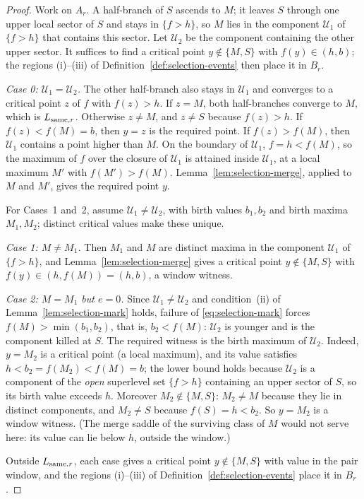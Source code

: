 \begin{proof}
Work on $A_r$. A half-branch of $S$ ascends to $M$; it leaves $S$ through one upper local sector of $S$ and stays in $\{f>h\}$, so $M$ lies in the component $\mathcal U_1$ of $\{f>h\}$ that contains this sector. Let $\mathcal U_2$ be the component containing the other upper sector. It suffices to find a critical point $y\notin\{M,S\}$ with $f(y)\in(h,b)$; the regions (i)--(iii) of Definition~\ref{def:selection-events} then place it in $B_r$.

\emph{Case 0: $\mathcal U_1=\mathcal U_2$.} The other half-branch also stays in $\mathcal U_1$ and converges to a critical point $z$ of $f$ with $f(z)>h$. If $z=M$, both half-branches converge to $M$, which is $L_{{\rm same},r}$. Otherwise $z\ne M$, and $z\ne S$ because $f(z)>h$. If $f(z)<f(M)=b$, then $y=z$ is the required point. If $f(z)>f(M)$, then $\mathcal U_1$ contains a point higher than $M$. On the boundary of $\mathcal U_1$, $f=h<f(M)$, so the maximum of $f$ over the closure of $\mathcal U_1$ is attained inside $\mathcal U_1$, at a local maximum $M'$ with $f(M')>f(M)$. Lemma~\ref{lem:selection-merge}, applied to $M$ and $M'$, gives the required point $y$.

For Cases~1 and~2, assume $\mathcal U_1\ne\mathcal U_2$, with birth values $b_1,b_2$ and birth maxima $M_1,M_2$; distinct critical values make these unique.

\emph{Case 1: $M\ne M_1$.} Then $M_1$ and $M$ are distinct maxima in the component $\mathcal U_1$ of $\{f>h\}$, and Lemma~\ref{lem:selection-merge} gives a critical point $y\notin\{M,S\}$ with $f(y)\in(h,f(M))=(h,b)$, a window witness.

\emph{Case 2: $M=M_1$ but $e=0$.} Since $\mathcal U_1\ne\mathcal U_2$ and condition~(ii) of Lemma~\ref{lem:selection-mark} holds, failure of \eqref{eq:selection-mark} forces $f(M)>\min(b_1,b_2)$, that is, $b_2<f(M)$: $\mathcal U_2$ is younger and is the component killed at $S$. The required witness is the birth maximum of $\mathcal U_2$. Indeed, $y=M_2$ is a critical point (a local maximum), and its value satisfies $h<b_2=f(M_2)<f(M)=b$; the lower bound holds because $\mathcal U_2$ is a component of the \emph{open} superlevel set $\{f>h\}$ containing an upper sector of $S$, so its birth value exceeds $h$. Moreover $M_2\notin\{M,S\}$: $M_2\ne M$ because they lie in distinct components, and $M_2\ne S$ because $f(S)=h<b_2$. So $y=M_2$ is a window witness. (The merge saddle of the surviving class of $M$ would not serve here: its value can lie below $h$, outside the window.)

Outside $L_{{\rm same},r}$, each case gives a critical point $y\notin\{M,S\}$ with value in the pair window, and the regions (i)--(iii) of Definition~\ref{def:selection-events} place it in $B_r$.
\end{proof}

